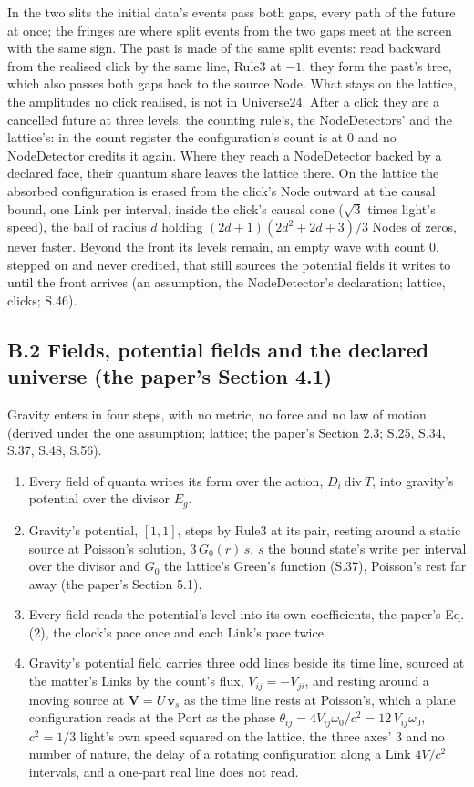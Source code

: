 \documentclass[pdflatex,sn-mathphys-num]{sn-jnl}
\newcommand{\ddiv}{\ \mathrm{div}\ }
\theoremstyle{thmstyleone}
\begin{document}
In the two slits the initial data's events pass both gaps, every path of the future at once; the fringes are where split events from the two gaps meet at the screen with the same sign. The past is made of the same split events: read backward from the realised click by the same line, Rule3 at $-1$, they form the past's tree, which also passes both gaps back to the source Node. What stays on the lattice, the amplitudes no click realised, is not in Universe24. After a click they are a cancelled future at three levels, the counting rule's, the NodeDetectors' and the lattice's: in the count register the configuration's count is at $0$ and no NodeDetector credits it again. Where they reach a NodeDetector backed by a declared face, their quantum share leaves the lattice there. On the lattice the absorbed configuration is erased from the click's Node outward at the causal bound, one Link per interval, inside the click's causal cone ($\sqrt 3$ times light's speed), the ball of radius $d$ holding $(2d + 1)(2d^2 + 2d + 3) / 3$ Nodes of zeros, never faster. Beyond the front its levels remain, an empty wave with count $0$, stepped on and never credited, that still sources the potential fields it writes to until the front arrives (an assumption, the NodeDetector's declaration; lattice, clicks; S.46).

\subsection*{B.2 Fields, potential fields and the declared universe (the paper's Section 4.1)}

Gravity enters in four steps, with no metric, no force and no law of motion (derived under the one assumption; lattice; the paper's Section 2.3; S.25, S.34, S.37, S.48, S.56).
\begin{enumerate}
\item Every field of quanta writes its form over the action, $D_i \ddiv T$, into gravity's potential over the divisor $E_g$.
\item Gravity's potential, $[1, 1]$, steps by Rule3 at its pair, resting around a static source at Poisson's solution, $3\,G_0(r)\,s$, $s$ the bound state's write per interval over the divisor and $G_0$ the lattice's Green's function (S.37), Poisson's rest far away (the paper's Section 5.1).
\item Every field reads the potential's level into its own coefficients, the paper's Eq. (2), the clock's pace once and each Link's pace twice.
\item Gravity's potential field carries three odd lines beside its time line, sourced at the matter's Links by the count's flux, $V_{ij} = -V_{ji}$, and resting around a moving source at $\mathbf V = U\,\mathbf v_s$ as the time line rests at Poisson's, which a plane configuration reads at the Port as the phase $\theta_{ij} = 4V_{ij}\omega_0 / c^2 = 12\,V_{ij}\omega_0$, $c^2 = 1/3$ light's own speed squared on the lattice, the three axes' $3$ and no number of nature, the delay of a rotating configuration along a Link $4V / c^2$ intervals, and a one-part real line does not read.
\end{enumerate}
\end{document}
